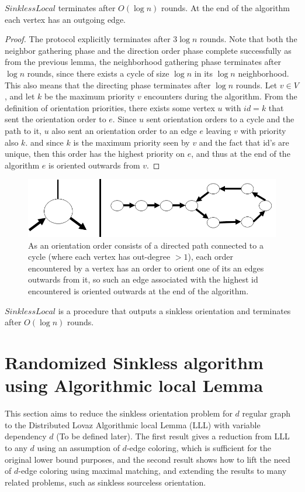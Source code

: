 \begin{corollary}
$SinklessLocal$ terminates after $O(\log{n})$ rounds. At the end of the algorithm each vertex has an outgoing edge.
\end{corollary}
\begin{proof}
The protocol explicitly terminates after $3\log{n}$ rounds. Note that both the neighbor gathering phase and the direction order phase complete successfully as from the previous lemma, the neighborhood gathering phase terminates after $\log{n}$ rounds, since there exists a cycle of size $\log{n}$ in its $\log{n}$ neighborhood. This also means that the directing phase terminates after $\log{n}$ rounds.  Let $v \in V$, and let $k$ be the maximum priority $v$ encounters during the algorithm. From the definition of orientation priorities, there exists some vertex $u$ with $id=k$ that sent the orientation order to $e$. Since $u$ sent orientation orders to a cycle and the path to it, $u$ also sent an orientation order to an edge $e$ leaving $v$ with priority also $k$. and since $k$ is the maximum priority seen by $v$ and the fact that id's are unique, then this order has the highest priority on $e$, and thus at the end of the algorithm $e$ is oriented outwards from $v$.
\end{proof}
\begin{figure}[h]
	\centering
	\includegraphics[width=0.5\textheight]{img/sinklessProof}
	\caption{As an orientation order consists of a directed path connected to a cycle (where each vertex has out-degree $> 1$), each order encountered by a vertex has an order to orient one of its an edges outwards from it, so such an edge associated with the highest id encountered is oriented outwards at the end of the algorithm.}
\end{figure}

\begin{theorem}
$SinklessLocal$ is a procedure that outputs a sinkless orientation and terminates after $O(\log{n})$ rounds.
\end{theorem}

\section{Randomized Sinkless algorithm using Algorithmic local Lemma}
\label{sec:rand_lovasz}
This section aims to reduce the sinkless orientation problem for $d$ regular graph to the Distributed Lovaz Algorithmic local Lemma (LLL) with variable dependency $d$ (To be defined later). The first result gives a reduction from LLL to any $d$ using an assumption of $d$-edge coloring, which is sufficient for the original lower bound purposes, and the second result shows how to lift the need of $d$-edge coloring using maximal matching, and extending the results to many related problems, such as sinkless sourceless orientation.

